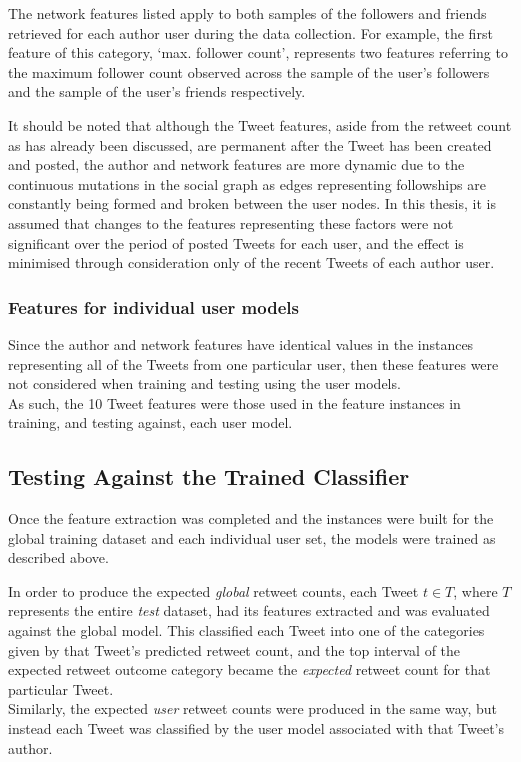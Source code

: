 The network features listed apply to both samples of the followers and friends retrieved for each author user during the data collection. For example, the first feature of this category, `max. follower count', represents two features referring to the maximum follower count observed across the sample of the user's followers and the sample of the user's friends respectively.

It should be noted that although the Tweet features, aside from the retweet count as has already been discussed, are permanent after the Tweet has been created and posted, the author and network features are more dynamic due to the continuous mutations in the social graph as edges representing followships are constantly being formed and broken between the user nodes. In this thesis, it is assumed that changes to the features representing these factors were not significant over the period of posted Tweets for each user, and the effect is minimised through consideration only of the recent Tweets of each author user.


\subsubsection{Features for individual user models}
Since the author and network features have identical values in the instances representing all of the Tweets from one particular user, then these features were not considered when training and testing using the user models.\\
As such, the 10 Tweet features were those used in the feature instances in training, and testing against, each user model.

 

\subsection{Testing Against the Trained Classifier}
Once the feature extraction was completed and the instances were built for the global training dataset and each individual user set, the models were trained as described above.

In order to produce the expected \textit{global} retweet counts, each Tweet $t \in T$, where $T$ represents the entire \textit{test} dataset, had its features extracted and was evaluated against the global model. This classified each Tweet into one of the categories given by that Tweet's predicted retweet count, and the top interval of the expected retweet outcome category became the \textit{expected} retweet count for that particular Tweet.\\
Similarly, the expected \textit{user} retweet counts were produced in the same way, but instead each Tweet was classified by the user model associated with that Tweet's author.

